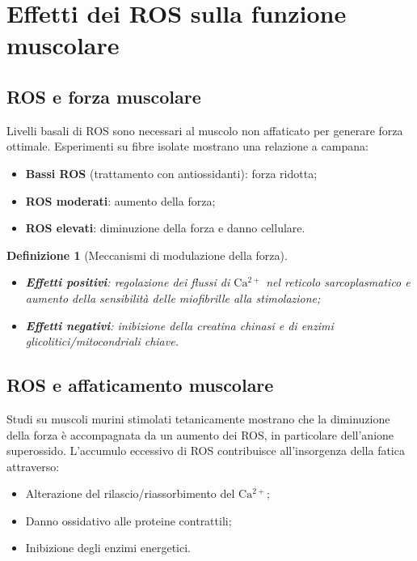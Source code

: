 \documentclass[12pt,a4paper]{report}
\newtheorem{definizione}{Definizione}[section]
\begin{document}
\section{Effetti dei ROS sulla funzione muscolare}
\subsection{ROS e forza muscolare}
Livelli basali di ROS sono necessari al muscolo non affaticato per generare forza ottimale. Esperimenti su fibre isolate mostrano una relazione a campana:
\begin{itemize}
\item \textbf{Bassi ROS} (trattamento con antiossidanti): forza ridotta;
\item \textbf{ROS moderati}: aumento della forza;
\item \textbf{ROS elevati}: diminuzione della forza e danno cellulare.
\end{itemize}

\begin{definizione}[Meccanismi di modulazione della forza]
\begin{itemize}
\item \textbf{Effetti positivi}: regolazione dei flussi di \(\mathrm{Ca^{2+}}\) nel reticolo sarcoplasmatico e aumento della sensibilità delle miofibrille alla stimolazione;
\item \textbf{Effetti negativi}: inibizione della creatina chinasi e di enzimi glicolitici/mitocondriali chiave.
\end{itemize}
\end{definizione}

\subsection{ROS e affaticamento muscolare}
Studi su muscoli murini stimolati tetanicamente mostrano che la diminuzione della forza è accompagnata da un aumento dei ROS, in particolare dell'anione superossido. L'accumulo eccessivo di ROS contribuisce all'insorgenza della fatica attraverso:
\begin{itemize}
\item Alterazione del rilascio/riassorbimento del \(\mathrm{Ca^{2+}}\);
\item Danno ossidativo alle proteine contrattili;
\item Inibizione degli enzimi energetici.
\end{itemize}
\end{document}
